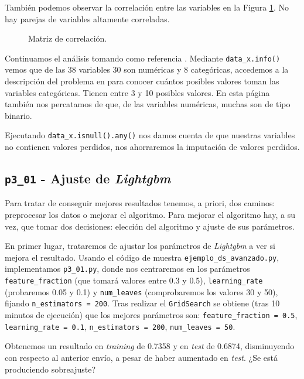 \documentclass[a4paper, 20pt]{article}
\begin{document}
También podemos observar la correlación entre las variables en la Figura \ref{fig:corr_matrix}. No hay parejas de variables altamente correladas.

\begin{figure}[H]
  \centering
  
  \caption{Matriz de correlación.}
  \label{fig:corr_matrix}
\end{figure}

Continuamos el análisis tomando como referencia \cite{noauthor_model_nodate}. Mediante \texttt{data\_x.info()} vemos que de las 38 variables 30 son numéricas y 8 categóricas, accedemos a la descripción del problema en \cite{drivendata_richters_nodate-1}
para conocer cuántos posibles valores toman las variables categóricas. Tienen entre 3 y 10 posibles valores. En esta página también nos percatamos de que, de las variables numéricas, muchas son de tipo binario.

Ejecutando \texttt{data\_x.isnull().any()} nos damos cuenta de que nuestras variables no contienen valores perdidos, nos ahorraremos la imputación de valores perdidos.

\subsection{\texttt{p3\_01} - Ajuste de \textit{Lightgbm}}

Para tratar de conseguir mejores resultados tenemos, a priori, dos caminos: preprocesar los datos o mejorar el algoritmo. Para mejorar el algoritmo hay, a su vez, que tomar dos decisiones: elección del algoritmo y ajuste de sus parámetros.

En primer lugar, trataremos de ajustar los parámetros de \textit{Lightgbm} a ver si mejora el resultado. Usando el código de muestra \texttt{ejemplo\_ds\_avanzado.py}, implementamos \texttt{p3\_01.py}, donde nos centraremos en los parámetros \texttt{feature\_fraction} (que tomará valores entre 0.3 y 0.5), \texttt{learning\_rate} (probaremos 0.05 y 0.1) y \texttt{num\_leaves} (comprobaremos los valores 30 y 50), fijando \texttt{n\_estimators = 200}. Tras realizar el \texttt{GridSearch} se obtiene (tras 10 minutos de ejecución) que los mejores parámetros son: \texttt{feature\_fraction = 0.5}, \texttt{learning\_rate = 0.1},  \texttt{n\_estimators = 200}, \texttt{num\_leaves = 50}.

Obtenemos un resultado en \textit{training} de 0.7358 y en \textit{test} de 0.6874, disminuyendo con respecto al anterior envío, a pesar de haber aumentado en \textit{test}. ¿Se está produciendo sobreajuste?
\end{document}
